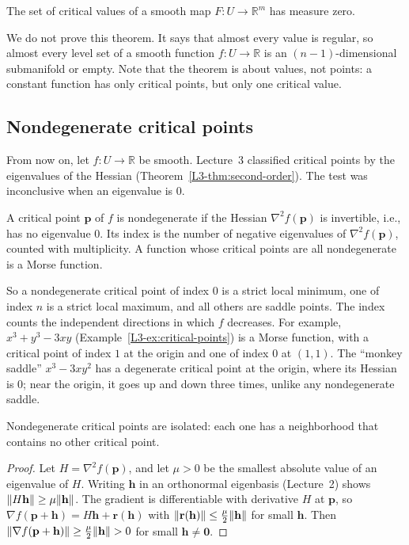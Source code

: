 \begin{theorem}[Sard]\label{A-thm:sard}
    The set of critical values of a smooth map $F: U \to \mathbb{R}^m$ has measure zero.
\end{theorem}

We do not prove this theorem. It says that almost every value is regular, so almost every level set of a smooth function $f: U \to \mathbb{R}$ is an $(n - 1)$-dimensional submanifold or empty. Note that the theorem is about values, not points: a constant function has only critical points, but only one critical value.

\subsection{Nondegenerate critical points}

From now on, let $f: U \to \mathbb{R}$ be smooth. Lecture~3 classified critical points by the eigenvalues of the Hessian (Theorem~\ref{L3-thm:second-order}). The test was inconclusive when an eigenvalue is $0$.

\begin{definition}\label{A-def:index}
    A critical point $\mathbf{p}$ of $f$ is nondegenerate if the Hessian $\nabla^2 f(\mathbf{p})$ is invertible, i.e., has no eigenvalue $0$. Its index is the number of negative eigenvalues of $\nabla^2 f(\mathbf{p})$, counted with multiplicity. A function whose critical points are all nondegenerate is a Morse function.
\end{definition}

So a nondegenerate critical point of index $0$ is a strict local minimum, one of index $n$ is a strict local maximum, and all others are saddle points. The index counts the independent directions in which $f$ decreases. For example, $x^3 + y^3 - 3xy$ (Example~\ref{L3-ex:critical-points}) is a Morse function, with a critical point of index $1$ at the origin and one of index $0$ at $(1, 1)$. The ``monkey saddle'' $x^3 - 3xy^2$ has a degenerate critical point at the origin, where its Hessian is $0$; near the origin, it goes up and down three times, unlike any nondegenerate saddle.

\begin{proposition}\label{A-prop:isolated}
    Nondegenerate critical points are isolated: each one has a neighborhood that contains no other critical point.
\end{proposition}

\begin{proof}
    Let $H = \nabla^2 f(\mathbf{p})$, and let $\mu > 0$ be the smallest absolute value of an eigenvalue of $H$. Writing $\mathbf{h}$ in an orthonormal eigenbasis (Lecture~2) shows $\lVert H\mathbf{h} \rVert \geq \mu\lVert \mathbf{h} \rVert$. The gradient is differentiable with derivative $H$ at $\mathbf{p}$, so $\nabla f(\mathbf{p} + \mathbf{h}) = H\mathbf{h} + \mathbf{r}(\mathbf{h})$ with $\lVert \mathbf{r}(\mathbf{h}) \rVert \leq \frac{\mu}{2}\lVert \mathbf{h} \rVert$ for small $\mathbf{h}$. Then $\lVert \nabla f(\mathbf{p} + \mathbf{h}) \rVert \geq \frac{\mu}{2}\lVert \mathbf{h} \rVert > 0$ for small $\mathbf{h} \neq \mathbf{0}$.
\end{proof}

